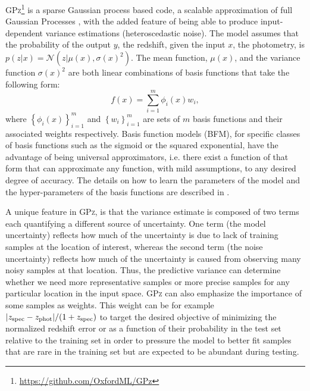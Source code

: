 \textsc{GPz}\footnote{\url{https://github.com/OxfordML/GPz}} \citep{Almosallam:16a,Almosallam:15b} is a sparse Gaussian process based code, a scalable approximation of full Gaussian Processes \citep{Rasmussen:06}, with the added feature of being able to produce input-dependent variance estimations (heteroscedastic noise).
The model assumes that the probability of the output $y$, the redshift, given the input $x$, the photometry, is $p(z|x)=\mathcal{N}\left(z|\mu(x),\sigma(x)^{2}\right)$. The mean function, $\mu(x)$, and the variance function $\sigma(x)^{2}$ are both linear combinations of basis functions that take the following form:
\begin{equation}
f(x)=\sum_{i=1}^{m}\phi_{i}(x)w_{i},
\end{equation}
where $\left\{\phi_{i}(x)\right\}_{i=1}^{m}$ and $\left\{w_{i}\right\}_{i=1}^{m}$ are sets of $m$ basis functions and their associated weights respectively.
Basis function models (BFM), for specific classes of basis functions such as the sigmoid or the squared exponential, have the advantage of being universal approximators, i.e. there exist a function of that form that can approximate any function, with mild assumptions, to any desired degree of accuracy.
The details on how to learn the parameters of the model and the hyper-parameters of the basis functions are described in \citet{Almosallam:15b}.

A unique feature in \textsc{GPz}, is that the variance estimate is composed of two terms each quantifying a different source of uncertainty.
One term (the model uncertainty) reflects how much of the uncertainty is due to lack of training samples at the location of interest, whereas the second term (the noise uncertainty) reflects how much of the uncertainty is caused from observing many noisy samples at that location.
Thus, the predictive variance can determine whether we need more representative samples or more precise samples for any particular location in the input space.
\textsc{GPz} can also emphasize the importance of some samples as weights. This weight can be for example $|z_{\rm{spec}}-z_{\rm{phot}}|/(1+z_{\rm{spec}})$ to target the desired objective of minimizing the normalized redshift error or as a function of their probability in the test set relative to the training set in order to pressure the model to better fit samples that are rare in the training set but are expected to be abundant during testing.

